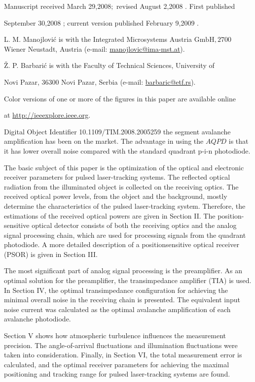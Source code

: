 \documentclass[10pt]{article}
\begin{document}
Manuscript received March 29,\(2008 ;\) revised August 2,2008 . First published

September 30,2008 ; current version published February 9,2009 .

L. M. Manojlović is with the Integrated Microsystems Austria \(\mathrm{GmbH}, 2700\) Wiener Neustadt, Austria (e-mail: \href{mailto:manojlovic@ima-mst.at}{manojlovic@ima-mst.at}).

Ž. P. Barbarić is with the Faculty of Technical Sciences, University of

Novi Pazar, 36300 Novi Pazar, Serbia (e-mail: \href{mailto:barbaric@etf.rs}{barbaric@etf.rs}).

Color versions of one or more of the figures in this paper are available online

at \href{http://ieeexplore.ieee.org}{http://ieeexplore.ieee.org}.

Digital Object Identifier 10.1109/TIM.2008.2005259 the segment avalanche amplification has been on the market. The advantage in using the \(A Q P D\) is that it has lower overall noise compared with the standard quadrant p-i-n photodiode.

The basic subject of this paper is the optimization of the optical and electronic receiver parameters for pulsed laser-tracking systems. The reflected optical radiation from the illuminated object is collected on the receiving optics. The received optical power levels, from the object and the background, mostly determine the characteristics of the pulsed laser-tracking system. Therefore, the estimations of the received optical powers are given in Section II. The position-sensitive optical detector consists of both the receiving optics and the analog signal processing chain, which are used for processing signals from the quadrant photodiode. A more detailed description of a positionsensitive optical receiver (PSOR) is given in Section III.

The most significant part of analog signal processing is the preamplifier. As an optimal solution for the preamplifier, the transimpedance amplifier (TIA) is used. In Section IV, the optimal transimpedance configuration for achieving the minimal overall noise in the receiving chain is presented. The equivalent input noise current was calculated as the optimal avalanche amplification of each avalanche photodiode.

Section \(\mathrm{V}\) shows how atmospheric turbulence influences the measurement precision. The angle-of-arrival fluctuations and illumination fluctuations were taken into consideration. Finally, in Section VI, the total measurement error is calculated, and the optimal receiver parameters for achieving the maximal positioning and tracking range for pulsed laser-tracking systems are found.
\end{document}
